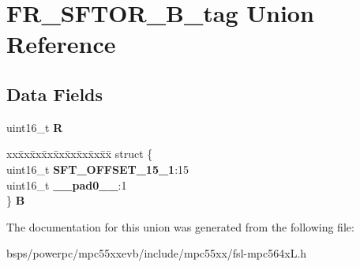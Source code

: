 \hypertarget{unionFR__SFTOR__16B__tag}{}\section{F\+R\+\_\+\+S\+F\+T\+O\+R\+\_\+B\+\_\+tag Union Reference}
\label{unionFR__SFTOR__16B__tag}
\subsection*{Data Fields}
\begin{DoxyCompactItemize}
\item 
\mbox{\label{unionFR__SFTOR__16B__tag_a664a34a26e805ea83efb7a6702ac8b03}} 
uint16\+\_\+t {\bfseries R}
\item 
\mbox{\label{unionFR__SFTOR__16B__tag_ae510f6c92f9fce287965b86f5bda3b66}} 
\begin{tabbing}
xx\=xx\=xx\=xx\=xx\=xx\=xx\=xx\=xx\=\kill
struct \{\\
\>uint16\_t {\bfseries SFT\_OFFSET\_15\_1}:15\\
\>uint16\_t {\bfseries \_\_pad0\_\_}:1\\
\} {\bfseries B}\\

\end{tabbing}\end{DoxyCompactItemize}


The documentation for this union was generated from the following file\+:\begin{DoxyCompactItemize}
\item 
bsps/powerpc/mpc55xxevb/include/mpc55xx/fsl-\/mpc564x\+L.\+h\end{DoxyCompactItemize}
